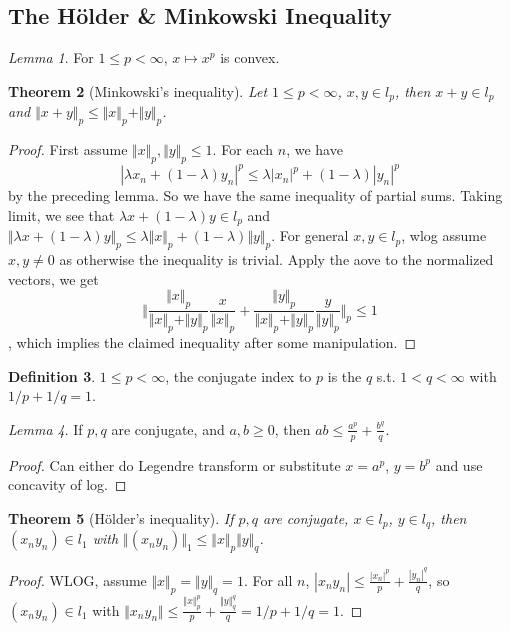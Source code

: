 \documentclass{article}
\theoremstyle{definition}
\newtheorem{defn}{Definition}[section]
\theoremstyle{remark}
\newtheorem{lem}[defn]{Lemma}
\theoremstyle{plain}
\newtheorem{thm}[defn]{Theorem}
\begin{document}
\subsection{The H\"older \& Minkowski Inequality}
\begin{lem}
    For $1\le p<\infty$, $x\mapsto x^p$ is convex.
\end{lem}
\begin{thm}[Minkowski's inequality]
Let $1\le p<\infty$, $x,y\in l_p$, then $x+y\in l_p$ and $\Vert x+y\Vert_p\le\Vert x\Vert_p+\Vert y\Vert_p$.
\end{thm}
\begin{proof}
First assume $\Vert x\Vert_p,\Vert y\Vert_p\le 1$. For each $n$, we have 
\[|\lambda x_n+(1-\lambda) y_n|^p\le\lambda|x_n|^p+(1-\lambda)|y_n|^p\]
by the preceding lemma. So we have the same inequality of partial sums. Taking limit, we see that $\lambda x+(1-\lambda)y\in l_p$ and $\Vert \lambda x+(1-\lambda)y\Vert_p\le\lambda\Vert x\Vert_p+(1-\lambda)\Vert y\Vert_p$. For general $x,y\in l_p$, wlog assume $x,y\neq 0$ as otherwise the inequality is trivial. Apply the aove to the normalized vectors, we get
\[\Bigg\Vert\dfrac{\Vert x\Vert_p}{\Vert x\Vert_p+\Vert y\Vert_p}\dfrac{x}{\Vert x\Vert_p}+\dfrac{\Vert y\Vert_p}{\Vert x\Vert_p+\Vert y\Vert_p}\dfrac{y}{\Vert y\Vert_p}\Bigg\Vert_p\le 1\], which implies the claimed inequality after some manipulation.
\end{proof}
\begin{defn}
    $1\le p<\infty$, the conjugate index to $p$ is the $q$ s.t. $1<q<\infty$ with $1/p+1/q=1$.
\end{defn}
\begin{lem}
    If $p,q$ are conjugate, and $a,b\ge 0$, then $ab\le \frac{a^p}{p}+\frac{b^q}{q}$.
\end{lem}
\begin{proof}
    Can either do Legendre transform or substitute $x=a^p$, $y=b^p$ and use concavity of log.
\end{proof}
\begin{thm}[H\"older's inequality] If $p,q$ are conjugate, $x\in l_p$, $y\in l_q$, then $(x_ny_n)\in l_1$ with $\Vert (x_ny_n)\Vert_1\le\Vert x\Vert_p\Vert y\Vert_q$.
\end{thm}
\begin{proof}
    WLOG, assume $\Vert x\Vert_p=\Vert y\Vert_q=1$. For all $n$, $|x_ny_n|\le \frac{|x_n|^p}{p}+\frac{|y_n|^q}{q}$, so $(x_ny_n)\in l_1$ with $\Vert x_ny_n\Vert\le\frac{\Vert x\Vert_p^p}{p}+\frac{\Vert y\Vert_q^q}{q}=1/p+1/q=1$.
\end{proof}
\end{document}
